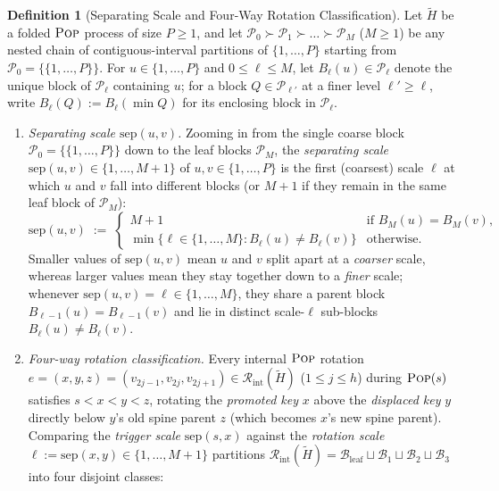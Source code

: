 \documentclass[11pt]{article}
\theoremstyle{definition}
\newtheorem*{definition*}{Definition}
\theoremstyle{remark}
\newcommand{\sep}{\mathrm{sep}}
\newcommand{\POP}{\textnormal{\scshape Pop}}
\begin{document}
\begin{definition*}[Separating Scale and Four-Way Rotation Classification]
Let $\widetilde{H}$ be a folded $\POP$ process of size $P \ge 1$, and let $\mathcal{P}_0 \succ \mathcal{P}_1 \succ \dots \succ \mathcal{P}_M$ ($M \ge 1$) be any nested chain of contiguous-interval partitions of $\{1, \dots, P\}$ starting from $\mathcal{P}_0 = \{\{1, \dots, P\}\}$. For $u \in \{1, \dots, P\}$ and $0 \le \ell \le M$, let $B_\ell(u) \in \mathcal{P}_\ell$ denote the unique block of $\mathcal{P}_\ell$ containing $u$; for a block $Q \in \mathcal{P}_{\ell'}$ at a finer level $\ell' \ge \ell$, write $B_\ell(Q) := B_\ell(\min Q)$ for its enclosing block in $\mathcal{P}_\ell$.
\begin{enumerate}[label=(\arabic*), leftmargin=2em, itemsep=3pt]
  \item \emph{Separating scale $\sep(u, v)$.} Zooming in from the single coarse block $\mathcal{P}_0 = \{\{1, \dots, P\}\}$ down to the leaf blocks $\mathcal{P}_M$, the \emph{separating scale} $\sep(u, v) \in \{1, \dots, M + 1\}$ of $u, v \in \{1, \dots, P\}$ is the first (coarsest) scale $\ell$ at which $u$ and $v$ fall into different blocks (or $M + 1$ if they remain in the same leaf block of $\mathcal{P}_M$):
  \[
  \sep(u, v) \;:=\;
  \begin{cases}
  M + 1 & \text{if } B_M(u) = B_M(v),\\
  \min\big\{\ell \in \{1, \dots, M\} : B_\ell(u) \ne B_\ell(v)\big\} & \text{otherwise.}
  \end{cases}
  \]
  Smaller values of $\sep(u, v)$ mean $u$ and $v$ split apart at a \emph{coarser} scale, whereas larger values mean they stay together down to a \emph{finer} scale; whenever $\sep(u, v) = \ell \in \{1, \dots, M\}$, they share a parent block $B_{\ell-1}(u) = B_{\ell-1}(v)$ and lie in distinct scale-$\ell$ sub-blocks $B_\ell(u) \ne B_\ell(v)$.
  \item \emph{Four-way rotation classification.} Every internal $\POP$ rotation $e = (x, y, z) = (v_{2j-1}, v_{2j}, v_{2j+1}) \in \mathcal{R}_{\mathrm{int}}(\widetilde{H})$ ($1 \le j \le h$) during $\POP(s)$ satisfies $s < x < y < z$, rotating the \emph{promoted key} $x$ above the \emph{displaced key} $y$ directly below $y$'s old spine parent $z$ (which becomes $x$'s new spine parent). Comparing the \emph{trigger scale} $\sep(s, x)$ against the \emph{rotation scale} $\ell := \sep(x, y) \in \{1, \dots, M + 1\}$ partitions $\mathcal{R}_{\mathrm{int}}(\widetilde{H}) = \mathcal{B}_{\mathrm{leaf}} \sqcup \mathcal{B}_1 \sqcup \mathcal{B}_2 \sqcup \mathcal{B}_3$ into four disjoint classes:

\end{enumerate}
\end{definition*}
\end{document}
